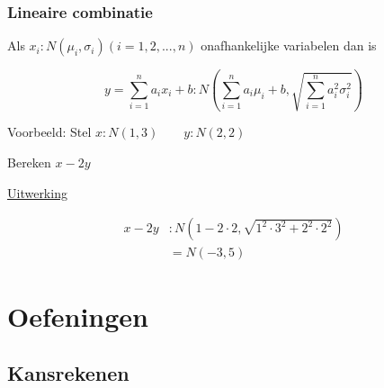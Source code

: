 \documentclass[12pt]{report}
\newcommand{\example}[2]{
      \hrulefill
      
      Voorbeeld: #1
      
      \underline{Uitwerking}
      
      #2
      
      \hrulefill
  }
\begin{document}
\section{Lineaire combinatie}
Als $x_i : N(\mu_i, \sigma_i)(i = 1, 2, ..., n)$ onafhankelijke variabelen dan is

$$y = \sum_{i = 1}^{n}a_i x_i + b : N(\sum_{i = 1}^{n} a_i \mu_i + b , \sqrt{\sum_{i = 1}^{n} a_i^2\sigma_i^2})$$
\example{
    Stel $x:N(1, 3) \qquad y:N(2, 2)$
    
    Bereken $x - 2y$
}{
    \begin{equation*}
     \begin{split}
      x - 2y & : N(1 - 2\cdot 2, \sqrt{1^2\cdot3^2 + 2^2\cdot2^2}) \\
             & = N(-3, 5)  
     \end{split}
    \end{equation*}

}



\part{Oefeningen}
\chapter{Kansrekenen}
  
\end{document}
